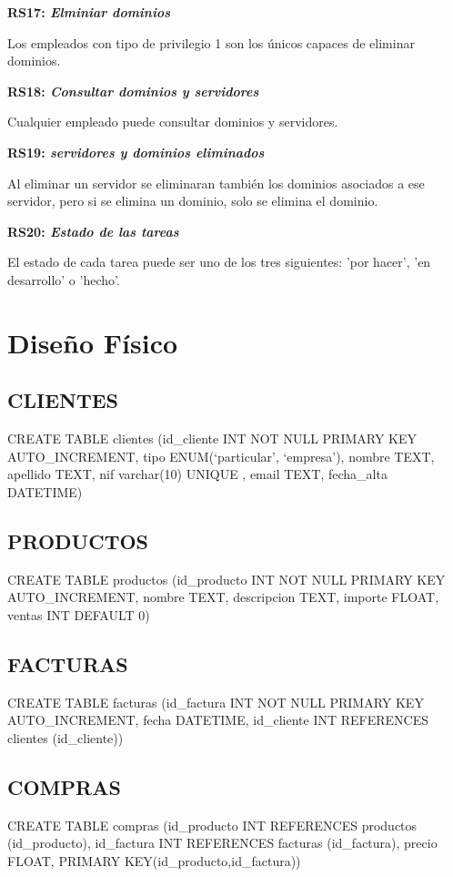 \documentclass[paper=a4, fontsize=11pt, spanish]{scrartcl}
\begin{document}
\setlength{\parindent}{0em}
\textbf{RS17: \textit{Elminiar dominios}}
\setlength{\parindent}{2em}

Los empleados con tipo de privilegio 1 son los únicos capaces de eliminar dominios.

\setlength{\parindent}{0em}
\textbf{RS18: \textit{Consultar dominios y servidores}}
\setlength{\parindent}{2em}

Cualquier empleado puede consultar dominios y servidores.

\setlength{\parindent}{0em}
\textbf{RS19: \textit{servidores y dominios eliminados}}
\setlength{\parindent}{2em}

Al eliminar un servidor se eliminaran también los dominios asociados a ese servidor, pero si se elimina un dominio, solo se elimina el dominio.

\setlength{\parindent}{0em}
\textbf{RS20: \textit{Estado de las tareas}}
\setlength{\parindent}{2em}

El estado de cada tarea puede ser uno de los tres siguientes: 'por hacer', 'en desarrollo' o 'hecho'.

\section{Diseño Físico}
\subsection{CLIENTES}
CREATE TABLE clientes (id\_cliente INT NOT NULL PRIMARY KEY AUTO\_INCREMENT, tipo ENUM(‘particular’, ‘empresa’),  nombre TEXT,  apellido TEXT, nif varchar(10) UNIQUE , email TEXT, fecha\_alta DATETIME)

\subsection{PRODUCTOS}
CREATE TABLE productos (id\_producto INT NOT NULL PRIMARY KEY AUTO\_INCREMENT, nombre TEXT,  descripcion TEXT,  importe FLOAT, ventas INT DEFAULT 0)

\subsection{FACTURAS}
CREATE TABLE facturas (id\_factura INT NOT NULL PRIMARY KEY AUTO\_INCREMENT, fecha DATETIME, id\_cliente INT REFERENCES clientes (id\_cliente))

\subsection{COMPRAS}
CREATE TABLE compras (id\_producto INT REFERENCES productos (id\_producto), id\_factura INT REFERENCES facturas (id\_factura), precio FLOAT, PRIMARY KEY(id\_producto,id\_factura))
\end{document}

